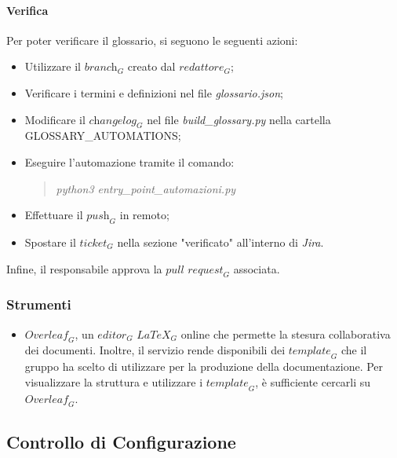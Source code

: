 \paragraph{Verifica} Per poter verificare il glossario, si seguono le seguenti azioni:
\begin{itemize}
    \item Utilizzare il $\textit{branch}_G$ creato dal $\textit{redattore}_G$;
    \item Verificare i termini e definizioni nel file \emph{glossario.json};
    \item Modificare il $\textit{changelog}_G$ nel file \emph{build\_glossary.py} nella cartella GLOSSARY\_AUTOMATIONS;
    \item Eseguire l'automazione tramite il comando:
        \begin{quote}
            \emph{  python3 entry\_point\_automazioni.py} 
        \end{quote}
    \item Effettuare il $\textit{push}_G$ in remoto;
    \item Spostare il $\textit{ticket}_G$ nella sezione "verificato" all'interno di \emph{Jira}.
\end{itemize}
Infine, il responsabile approva la $\textit{pull request}_G$ associata.

\subsubsection{Strumenti}
\begin{itemize}
\item \emph{\textbf{$\textit{Overleaf}_G$}}, un $\textit{editor}_G$ $\textit{LaTeX}_G$ online che permette la stesura collaborativa dei documenti. Inoltre, il servizio rende disponibili dei $\textit{template}_G$ che il gruppo ha scelto di utilizzare per la produzione della documentazione. Per visualizzare la struttura e utilizzare i $\textit{template}_G$, è sufficiente cercarli su $\textit{Overleaf}_G$. 
\end{itemize}

\subsection{Controllo di Configurazione}


